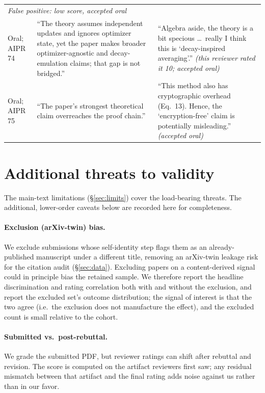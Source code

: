 \begin{table}[h]
\begin{tabular}{p{}p{}p{}}
    \midrule
    \multicolumn{3}{l}{\emph{False positive: low score, accepted oral}}\\[2pt]
    Oral; AIPR 74 & ``The theory assumes independent updates and ignores optimizer state, yet the paper makes broader optimizer-agnostic and decay-emulation claims; that gap is not bridged.'' & ``Algebra aside, the theory is a bit specious \ldots\ really I think this is `decay-inspired averaging'.'' \emph{(this reviewer rated it 10; accepted oral)} \\[3pt]
    Oral; AIPR 75 & ``The paper's strongest theoretical claim overreaches the proof chain.'' & ``This method also has cryptographic overhead (Eq.\ 13). Hence, the `encryption-free' claim is potentially misleading.'' \emph{(accepted oral)} \\
    \bottomrule
  \end{tabular}
\end{table}

\section{Additional threats to validity}
\label{app:limits}
The main-text limitations (\S\ref{sec:limits}) cover the load-bearing threats.
The additional, lower-order caveats below are recorded here for completeness.

\paragraph{Exclusion (arXiv-twin) bias.}
We exclude submissions whose self-identity step flags them as an already-published
manuscript under a different title, removing an arXiv-twin leakage risk for the
citation audit (\S\ref{sec:data}). Excluding papers on a content-derived signal
could in principle bias the retained sample. We therefore report the headline
discrimination and rating correlation both with and without the exclusion, and
report the excluded set's outcome distribution; the signal of interest is that the
two agree (i.e.\ the exclusion does not manufacture the effect), and the excluded
count is small relative to the cohort.

\paragraph{Submitted vs.\ post-rebuttal.}
We grade the submitted PDF, but reviewer ratings can shift after rebuttal and
revision. The score is computed on the artifact reviewers first saw; any residual
mismatch between that artifact and the final rating adds noise against us rather
than in our favor.

